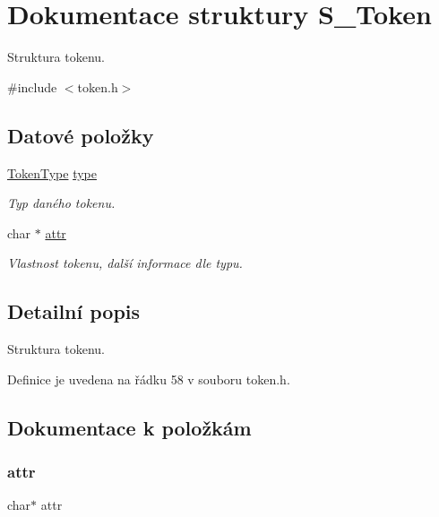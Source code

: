 \hypertarget{struct_s___token}{}\section{Dokumentace struktury S\+\_\+\+Token}
\label{struct_s___token}


Struktura tokenu.  




{\ttfamily \#include $<$token.\+h$>$}

\subsection*{Datové položky}
\begin{DoxyCompactItemize}
\item 
\hyperlink{token_8h_af940495a1407c2a014c0aed83c75ff20}{Token\+Type} \hyperlink{struct_s___token_a6e2d2148929ac137f2e2ef4091a4dc69}{type}
\begin{DoxyCompactList}\small\item\em Typ daného tokenu. \end{DoxyCompactList}\item 
char $\ast$ \hyperlink{struct_s___token_a128b80cc9c353ac261c3b7eee3139b68}{attr}
\begin{DoxyCompactList}\small\item\em Vlastnost tokenu, další informace dle typu. \end{DoxyCompactList}\end{DoxyCompactItemize}


\subsection{Detailní popis}
Struktura tokenu. 

Definice je uvedena na řádku 58 v souboru token.\+h.



\subsection{Dokumentace k položkám}
\mbox{\label{struct_s___token_a128b80cc9c353ac261c3b7eee3139b68}} 
\subsubsection{\texorpdfstring{attr}{attr}}
{\footnotesize\ttfamily char$\ast$ attr}




